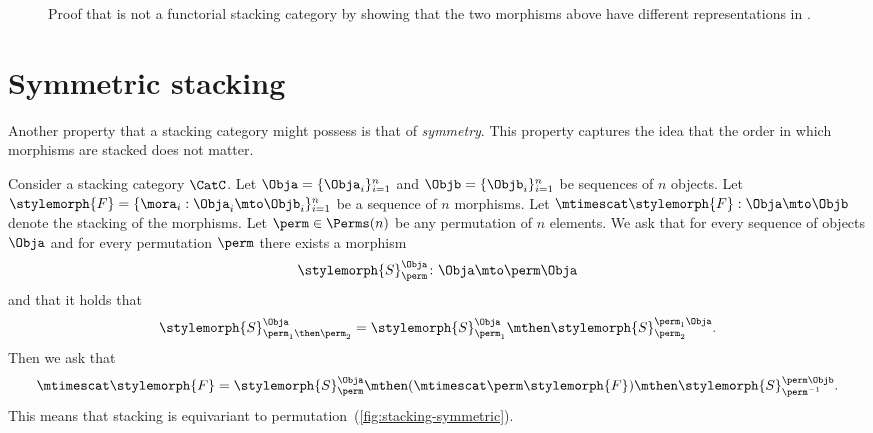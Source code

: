 \begin{figure*}[b]
    \centering
    \caption{Proof that \Effects is not a functorial stacking category by showing that
        the two morphisms above have different representations in \SetL.}
    \label{fig:effects-non-functorial}
\end{figure*}

\section{Symmetric stacking}

Another property that a stacking category might possess is that of \emph{symmetry}.
This property captures the idea that the order in which morphisms are stacked does not matter.

\begin{ctdefinition}
    \label{def:symmetric-stacking-category}
    Consider a stacking category $\CatC$.
    Let $\Obja = \{\Obja_i\}_{i=1}^n$ and $\Objb = \{\Objb_i\}_{i=1}^n$ be sequences of $n$ objects.
    Let $\stylemorph{F} = \{\mora_i : \Obja_i \mto  \Objb_i   \}_{i=1}^n$ be a sequence of $n$ morphisms.
    Let $\mtimescat \stylemorph{F}: \Obja \mto \Objb$ denote the stacking of the morphisms.
    Let $\perm\in\Perms(n)$ be any permutation of $n$ elements.
    We ask that for every sequence of objects $\Obja$ and for every permutation $\perm$ there exists a morphism
    \begin{equation}
        \stylemorph{S}^{\Obja}_\perm \colon \Obja \mto \perm  \Obja
    \end{equation}
    and that it holds that
    \begin{equation}
        \stylemorph{S}_{\perm_1 \then \perm_2}^{\Obja}
        =
        \stylemorph{S}_{\perm_1}^{\Obja} \mthen
        \stylemorph{S}_{\perm_2}^{\perm_1 \Obja} .
    \end{equation}
    Then we ask that
    \begin{equation}
        \label{eq:symmetric-condition}
        \mtimescat \stylemorph{F}  =
        \stylemorph{S}^{\Obja}_{\perm}
        \mthen
        (\mtimescat
        \perm \stylemorph{F} )
        \mthen
        \stylemorph{S}^{\perm \Objb}_{\perm^{-1}}.
    \end{equation}
    This means that stacking is equivariant to permutation~(\cref{fig:stacking-symmetric}).
\end{ctdefinition}

